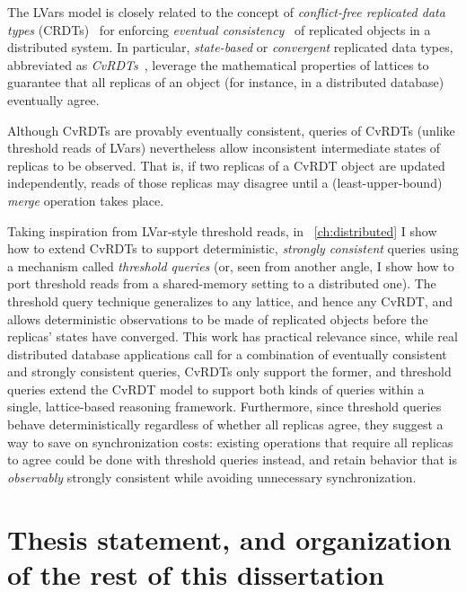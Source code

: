 The LVars model is closely related to the concept of
\emph{conflict-free replicated data types} (CRDTs)~\cite{crdts} for
enforcing \emph{eventual consistency}~\cite{vogels-ec} of replicated
objects in a distributed system.  In particular, \emph{state-based} or
\emph{convergent} replicated data types, abbreviated as
\emph{CvRDTs}~\cite{crdts, crdts-tr}, leverage the mathematical
properties of lattices to guarantee that all replicas of an object
(for instance, in a distributed database) eventually agree.

Although CvRDTs are provably eventually consistent, queries of CvRDTs
(unlike threshold reads of LVars) nevertheless allow inconsistent
intermediate states of replicas to be observed.  That is, if two
replicas of a CvRDT object are updated independently, reads of those
replicas may disagree until a (least-upper-bound) \emph{merge}
operation takes place.

Taking inspiration from LVar-style threshold reads, in
~\ref{ch:distributed} I show how to extend CvRDTs to support
deterministic, \emph{strongly consistent} queries using a mechanism
called \emph{threshold queries} (or, seen from another angle, I show
how to port threshold reads from a shared-memory setting to a
distributed one).  The threshold query technique generalizes to any
lattice, and hence any CvRDT, and allows deterministic observations to
be made of replicated objects before the replicas' states have
converged.  This work has practical relevance since, while real
distributed database applications call for a combination of eventually
consistent and strongly consistent queries, CvRDTs only support the
former, and threshold queries extend the CvRDT model to support both
kinds of queries within a single, lattice-based reasoning framework.
Furthermore, since threshold queries behave deterministically
regardless of whether all replicas agree, they suggest a way to save
on synchronization costs: existing operations that require all
replicas to agree could be done with threshold queries instead, and
retain behavior that is \emph{observably} strongly consistent while
avoiding unnecessary synchronization.
\fi

\ifdefined\DISSERTATION
\section{Thesis statement, and organization of the rest of this dissertation}\label{s:intro-thesis}

